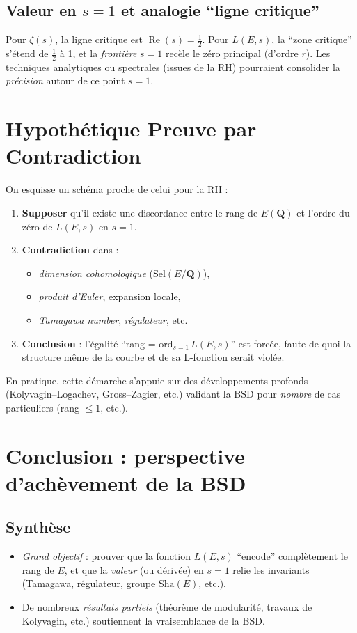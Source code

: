 \documentclass[11pt]{article}
\newcommand{\Sh}{\mathrm{Sha}}
\begin{document}
\subsection{Valeur en $s=1$ et analogie “ligne critique”}
Pour $\zeta(s)$, la ligne critique est $\operatorname{Re}(s)=\tfrac12$. Pour $L(E,s)$, la “zone critique” s'étend de $\tfrac12$ à 1, et la \emph{frontière} $s=1$ recèle le zéro principal (d'ordre $r$). Les techniques analytiques ou spectrales (issues de la RH) pourraient consolider la \emph{précision} autour de ce point $s=1$.

\section{Hypothétique Preuve par Contradiction}

On esquisse un schéma proche de celui pour la RH :
\begin{enumerate}
  \item \textbf{Supposer} qu'il existe une discordance entre le rang de $E(\mathbf{Q})$ et l'ordre du zéro de $L(E,s)$ en $s=1$.
  \item \textbf{Contradiction} dans :
    \begin{itemize}
      \item \emph{dimension cohomologique} ($\mathrm{Sel}(E/\mathbf{Q})$),
      \item \emph{produit d'Euler}, expansion locale,
      \item \emph{Tamagawa number}, \emph{régulateur}, etc.
    \end{itemize}
  \item \textbf{Conclusion} : l'égalité “rang = $\mathrm{ord}_{s=1}\,L(E,s)$” est forcée, faute de quoi la structure même de la courbe et de sa L-fonction serait violée.
\end{enumerate}
En pratique, cette démarche s'appuie sur des développements profonds (Kolyvagin--Logachev, Gross--Zagier, etc.) validant la BSD pour \emph{nombre} de cas particuliers (rang $\le1$, etc.).

\section{Conclusion : perspective d'achèvement de la BSD}

\subsection{Synthèse}
\begin{itemize}
  \item \emph{Grand objectif} : prouver que la fonction $L(E,s)$ ``encode'' complètement le rang de $E$, et que la \emph{valeur} (ou dérivée) en $s=1$ relie les invariants (Tamagawa, régulateur, groupe $\Sh(E)$, etc.). 
  \item De nombreux \emph{résultats partiels} (théorème de modularité, travaux de Kolyvagin, etc.) soutiennent la vraisemblance de la BSD.
\end{itemize}
\end{document}
